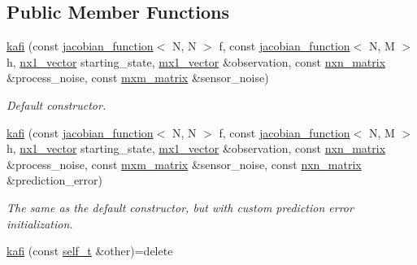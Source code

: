 \subsection*{Public Member Functions}
\begin{DoxyCompactItemize}
\item 
\hyperlink{classkafi_1_1kafi_aa77148b74aeb52b1d4853aaf02bb06a8}{kafi} (const \hyperlink{classkafi_1_1jacobian__function}{jacobian\+\_\+function}$<$ N, N $>$ f, const \hyperlink{classkafi_1_1jacobian__function}{jacobian\+\_\+function}$<$ N, M $>$ h, \hyperlink{classkafi_1_1kafi_a47144ae2efe936ede222eced035a6e46}{nx1\+\_\+vector} starting\+\_\+state, \hyperlink{classkafi_1_1kafi_a3a6f412f435a9e1f81178f36965822c3}{mx1\+\_\+vector} \&observation, const \hyperlink{classkafi_1_1kafi_a771d8045a61e16033e4a644675b5f4e7}{nxn\+\_\+matrix} \&process\+\_\+noise, const \hyperlink{classkafi_1_1kafi_af3ca34ea0c57e9054e4c2d51fc7e5971}{mxm\+\_\+matrix} \&sensor\+\_\+noise)
\begin{DoxyCompactList}\small\item\em Default constructor. \end{DoxyCompactList}\item 
\mbox{\label{classkafi_1_1kafi_a6218f5982061df432131779719d3055d}} 
\hyperlink{classkafi_1_1kafi_a6218f5982061df432131779719d3055d}{kafi} (const \hyperlink{classkafi_1_1jacobian__function}{jacobian\+\_\+function}$<$ N, N $>$ f, const \hyperlink{classkafi_1_1jacobian__function}{jacobian\+\_\+function}$<$ N, M $>$ h, \hyperlink{classkafi_1_1kafi_a47144ae2efe936ede222eced035a6e46}{nx1\+\_\+vector} starting\+\_\+state, \hyperlink{classkafi_1_1kafi_a3a6f412f435a9e1f81178f36965822c3}{mx1\+\_\+vector} \&observation, const \hyperlink{classkafi_1_1kafi_a771d8045a61e16033e4a644675b5f4e7}{nxn\+\_\+matrix} \&process\+\_\+noise, const \hyperlink{classkafi_1_1kafi_af3ca34ea0c57e9054e4c2d51fc7e5971}{mxm\+\_\+matrix} \&sensor\+\_\+noise, const \hyperlink{classkafi_1_1kafi_a771d8045a61e16033e4a644675b5f4e7}{nxn\+\_\+matrix} \&prediction\+\_\+error)
\begin{DoxyCompactList}\small\item\em The same as the default constructor, but with custom {\ttfamily prediction error} initialization. \end{DoxyCompactList}\item 
\mbox{\label{classkafi_1_1kafi_a02d964ca4eb4777101d26583daa8279d}} 
\hyperlink{classkafi_1_1kafi_a02d964ca4eb4777101d26583daa8279d}{kafi} (const \hyperlink{classkafi_1_1kafi_a9fc1cf6d76a14493ec33c03f3a3699c7}{self\+\_\+t} \&other)=delete

\end{DoxyCompactItemize}
